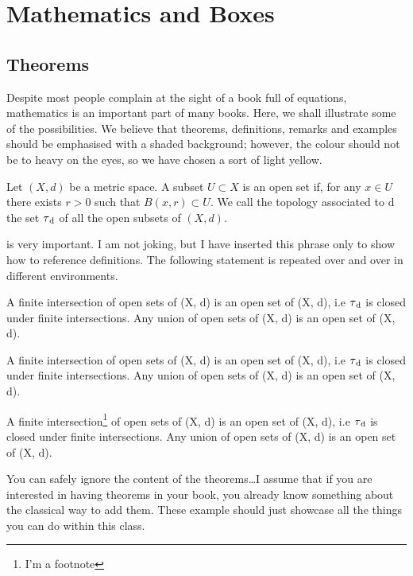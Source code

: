 \setchapterpreamble[u]{\margintoc}
\chapter{Mathematics and Boxes}

\section{Theorems}

Despite most people complain at the sight of a book full of equations,
mathematics is an important part of many books. Here, we shall
illustrate some of the possibilities. We believe that theorems,
definitions, remarks and examples should be emphasised with a shaded
background; however, the colour should not be to heavy on the eyes, so
we have chosen a sort of light yellow.

\begin{definition}
Let $(X, d)$ be a metric space. A subset $U \subset X$ is an open set
if, for any $x \in U$ there exists $r > 0$ such that $B(x, r) \subset
U$. We call the topology associated to d the set $\tau\textsubscript{d}$
of all the open subsets of $(X, d).$
\end{definition}

 is very important. I am not joking, but I have inserted
this phrase only to show how to reference definitions. The following
statement is repeated over and over in different environments.

\begin{theorem}
A finite intersection of open sets of (X, d) is an open set of (X, d),
i.e $\tau\textsubscript{d}$ is closed under finite intersections. Any
union of open sets of (X, d) is an open set of (X, d).
\end{theorem}

\begin{proposition}
A finite intersection of open sets of (X, d) is an open set of (X, d),
i.e $\tau\textsubscript{d}$ is closed under finite intersections. Any
union of open sets of (X, d) is an open set of (X, d).
\end{proposition}

\begin{lemma}
A finite intersection\footnote{I'm a footnote} of open sets of (X, d) is
an open set of (X, d), i.e $\tau\textsubscript{d}$ is closed under
finite intersections. Any union of open sets of (X, d) is an open set of
(X, d).
\end{lemma}

You can safely ignore the content of the theorems\ldots I assume that if
you are interested in having theorems in your book, you already know
something about the classical way to add them. These example should just
showcase all the things you can do within this class.
